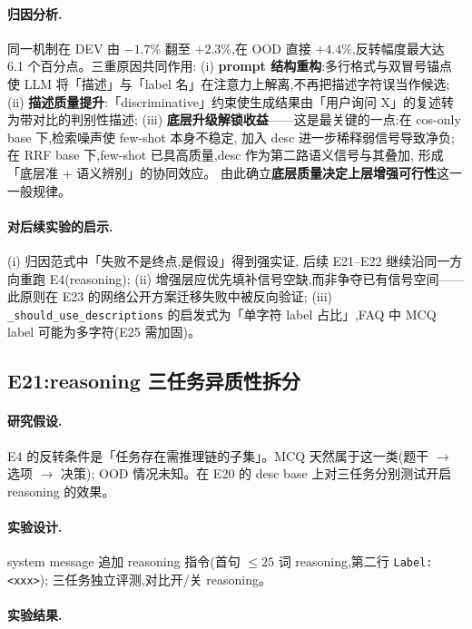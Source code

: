 \documentclass[11pt,a4paper]{ctexart}
\begin{document}
\paragraph{归因分析.}同一机制在 DEV 由 $-1.7\%$ 翻至 $+2.3\%$,在 OOD 直接 $+4.4\%$,反转幅度最大达 6.1 个百分点。三重原因共同作用:
(i) \textbf{prompt 结构重构}:多行格式与双冒号锚点使 LLM 将「描述」与「label 名」在注意力上解离,不再把描述字符误当作候选;
(ii) \textbf{描述质量提升}:「discriminative」约束使生成结果由「用户询问 X」的复述转为带对比的判别性描述;
(iii) \textbf{底层升级解锁收益}——这是最关键的一点:在 cos-only base 下,检索噪声使 few-shot 本身不稳定,
加入 desc 进一步稀释弱信号导致净负;在 RRF base 下,few-shot 已具高质量,desc 作为第二路语义信号与其叠加,
形成「底层准 + 语义辨别」的协同效应。
由此确立\textbf{底层质量决定上层增强可行性}这一一般规律。

\paragraph{对后续实验的启示.}(i) 归因范式中「失败不是终点,是假设」得到强实证,
后续 E21--E22 继续沿同一方向重跑 E4(reasoning);
(ii) 增强层应优先填补信号空缺,而非争夺已有信号空间——此原则在 E23 的网络公开方案迁移失败中被反向验证;
(iii) \texttt{\_should\_use\_descriptions} 的启发式为「单字符 label 占比」,FAQ 中 MCQ label 可能为多字符(E25 需加固)。

\subsection{E21:reasoning 三任务异质性拆分}

\paragraph{研究假设.}E4 的反转条件是「任务存在需推理链的子集」。MCQ 天然属于这一类(题干 $\to$ 选项 $\to$ 决策);
OOD 情况未知。在 E20 的 desc base 上对三任务分别测试开启 reasoning 的效果。

\paragraph{实验设计.}system message 追加 reasoning 指令(首句 $\le 25$ 词 reasoning,第二行 \verb|Label: <xxx>|);
三任务独立评测,对比开/关 reasoning。

\paragraph{实验结果.}
\end{document}

